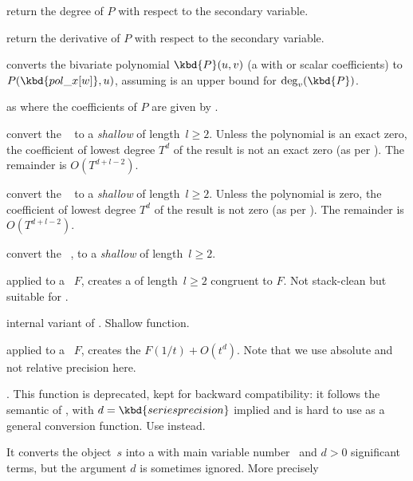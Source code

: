  return the degree of $P$ with respect to
the secondary variable.

 return the derivative of $P$ with respect to
the secondary variable.

 converts the bivariate polynomial
$\kbd{P}(u,v)$ (a  with  or scalar coefficients) to
$P(\kbd{pol\_x[w]},u)$, assuming  is an upper bound for
$\deg_v(\kbd{P})$.

as  where the coefficients of $P$ are given by
.

 convert the ~ to
a \emph{shallow}  of length~$l\geq 2$.
Unless the polynomial is an exact zero, the coefficient of lowest degree
$T^d$ of the result is not an exact zero (as per ). The
remainder is $O(T^{d+l-2})$.

 convert the ~ to
a \emph{shallow}  of length~$l\geq 2$.
Unless the polynomial is zero, the coefficient of lowest degree
$T^d$ of the result is not zero (as per ). The
remainder is $O(T^{d+l-2})$.

 convert the ~,
to a \emph{shallow}  of length~$l\geq 2$.

 applied to a ~$F$,
creates a  of length~$l\geq 2$ congruent to $F$. Not stack-clean
but suitable for .

 internal variant of
. Shallow function.

 applied to a
~$F$, creates the  $F(1/t) + O(t^d)$. Note that
we use absolute and not relative precision here.

. This function is deprecated,
kept for backward compatibility: it follows the semantic of ,
with $d = \kbd{seriesprecision}$ implied and is hard to use as a general
conversion function. Use  instead.

It converts the object~$s$ into a  with main variable number~
and $d > 0$ significant terms, but the argument $d$ is sometimes ignored.
More precisely

